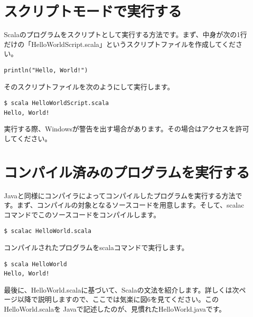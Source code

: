 \documentclass[10pt]{jarticle}
\begin{document}
\section{スクリプトモードで実行する}
Scalaのプログラムをスクリプトとして実行する方法です。まず、中身が次の1行だけの「HelloWorldScript.scala」というスクリプトファイルを作成してください。
\begin{lstlisting}
println("Hello, World!")
\end{lstlisting}
そのスクリプトファイルを次のようにして実行します。
\begin{verbatim}
$ scala HelloWorldScript.scala
Hello, World!
\end{verbatim}
実行する際、Windowsが警告を出す場合があります。その場合はアクセスを許可してください。 

\section{コンパイル済みのプログラムを実行する}
Javaと同様にコンパイラによってコンパイルしたプログラムを実行する方法です。まず、コンパイルの対象となるソースコードを用意します。そして、scalacコマンドでこのソースコードをコンパイルします。
\begin{verbatim}
$ scalac HelloWorld.scala
\end{verbatim}
コンパイルされたプログラムをscalaコマンドで実行します。
\begin{verbatim}
$ scala HelloWorld
Hello, World!
\end{verbatim}
最後に、HelloWorld.scalaに基づいて、Scalaの文法を紹介します。詳しくは次ページ以降で説明しますので、ここでは気楽に図6を見てください。このHelloWorld.scalaを Javaで記述したのが、見慣れたHelloWorld.javaです。
\end{document}
